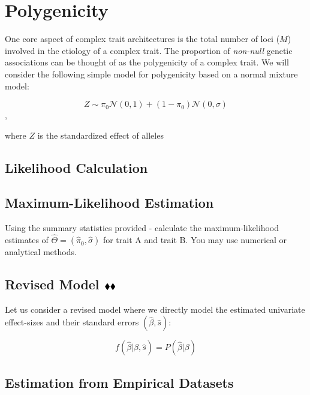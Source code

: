 \documentclass{pset}
\date{6/1/2025}
\begin{document}
\maketitle

\section{Polygenicity}

One core aspect of complex trait architectures is the total number of loci ($M$) involved in the etiology of a complex trait. The proportion of \textit{non-null} genetic associations can be thought of as the polygenicity of a complex trait. We will consider the following simple model for polygenicity based on a normal mixture model:  

$$Z \sim \pi_0 \mathcal{N}(0,1) + (1 - \pi_0)\mathcal{N}(0,\sigma)$$,

where $Z$ is the standardized effect of alleles

\subsection*{Likelihood Calculation}


\subsection*{Maximum-Likelihood Estimation}

Using the summary statistics provided - calculate the maximum-likelihood estimates of $\hat{\Theta} = (\hat{\pi}_0, \hat{\sigma})$ for trait A and trait B. You may use numerical or analytical methods. 

\subsection*{Revised Model $\mathbin{\blacklozenge}\mathbin{\blacklozenge}$}

Let us consider a revised model where we directly model the estimated univariate effect-sizes and their standard errors $(\hat{\beta}, \hat{s})$:

$$f(\hat{\beta} | \beta, \hat{s}) = P(\hat{\beta} | \beta)$$


\subsection*{Estimation from Empirical Datasets}

\end{document}

